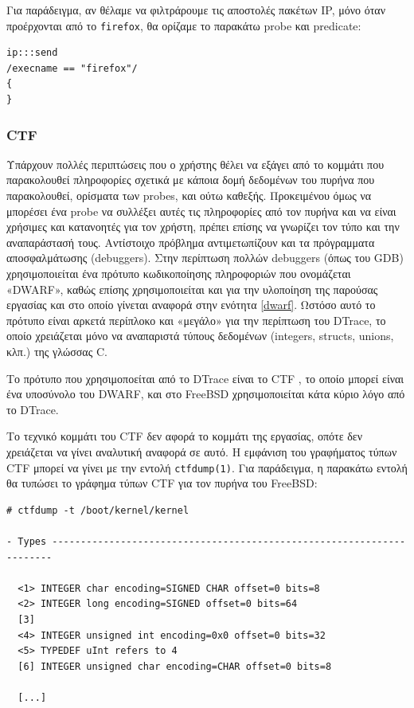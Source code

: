 \documentclass[12pt]{article}
\begin{document}
Για παράδειγμα, αν θέλαμε να φιλτράρουμε τις αποστολές πακέτων IP, μόνο όταν
προέρχονται από το \lstinline{firefox}, θα ορίζαμε το παρακάτω probe και
predicate:

\begin{lstlisting}
ip:::send
/execname == "firefox"/
{
}
\end{lstlisting}

\subsubsection{CTF} \label{ctf}

Υπάρχουν πολλές περιπτώσεις που ο χρήστης θέλει να εξάγει από το κομμάτι που
παρακολουθεί πληροφορίες σχετικά με κάποια δομή δεδομένων του πυρήνα που
παρακολουθεί, ορίσματα των probes, και ούτω καθεξής. Προκειμένου όμως να
μπορέσει ένα probe να συλλέξει αυτές τις πληροφορίες από τον πυρήνα και να
είναι χρήσιμες και κατανοητές για τον χρήστη, πρέπει επίσης να γνωρίζει τον
τύπο και την αναπαράστασή τους. Αντίστοιχο πρόβλημα αντιμετωπίζουν και τα
πρόγραμματα αποσφαλμάτωσης (debuggers). Στην περίπτωση πολλών debuggers (όπως
του GDB) χρησιμοποιείται ένα πρότυπο κωδικοποίησης πληροφοριών που ονομάζεται
«DWARF», καθώς επίσης χρησιμοποιείται και για την υλοποίηση της παρούσας
εργασίας και στο οποίο γίνεται αναφορά στην ενότητα \ref{dwarf}. Ωστόσο αυτό το
πρότυπο είναι αρκετά περίπλοκο και «μεγάλο» για την περίπτωση του DTrace, το
οποίο χρειάζεται μόνο να αναπαριστά τύπους δεδομένων (integers, structs,
unions, κλπ.) της γλώσσας C.

Το πρότυπο που χρησιμοποείται από το DTrace είναι το CTF \cite{ctf}, το οποίο
μπορεί είναι ένα υποσύνολο του DWARF, και στο FreeBSD χρησιμοποιείται κάτα
κύριο λόγο από το DTrace.

Το τεχνικό κομμάτι του CTF δεν αφορά το κομμάτι της εργασίας, οπότε δεν
χρειάζεται να γίνει αναλυτική αναφορά σε αυτό. Η εμφάνιση του γραφήματος τύπων
CTF μπορεί να γίνει με την εντολή \lstinline{ctfdump(1)}. Για παράδειγμα, η
παρακάτω εντολή θα τυπώσει το γράφημα τύπων CTF για τον πυρήνα του FreeBSD:

\begin{lstlisting}
# ctfdump -t /boot/kernel/kernel

- Types ----------------------------------------------------------------------

  <1> INTEGER char encoding=SIGNED CHAR offset=0 bits=8
  <2> INTEGER long encoding=SIGNED offset=0 bits=64
  [3]
  <4> INTEGER unsigned int encoding=0x0 offset=0 bits=32
  <5> TYPEDEF uInt refers to 4
  [6] INTEGER unsigned char encoding=CHAR offset=0 bits=8

  [...]
\end{lstlisting}
\end{document}
